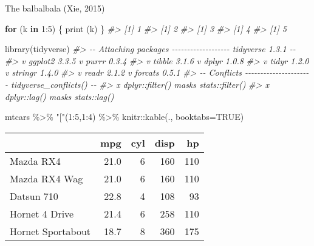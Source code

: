 \documentclass{source/tex/templates/maththesis}
\newenvironment{Shaded}{\begin{snugshade}}{\end{snugshade}}
\newcommand{\AttributeTok}[1]{\textcolor[rgb]{0.77,0.63,0.00}{#1}}
\newcommand{\CommentTok}[1]{\textcolor[rgb]{0.56,0.35,0.01}{\textit{#1}}}
\newcommand{\ConstantTok}[1]{\textcolor[rgb]{0.00,0.00,0.00}{#1}}
\newcommand{\ControlFlowTok}[1]{\textcolor[rgb]{0.13,0.29,0.53}{\textbf{#1}}}
\newcommand{\DecValTok}[1]{\textcolor[rgb]{0.00,0.00,0.81}{#1}}
\newcommand{\FunctionTok}[1]{\textcolor[rgb]{0.00,0.00,0.00}{#1}}
\newcommand{\NormalTok}[1]{#1}
\newcommand{\SpecialCharTok}[1]{\textcolor[rgb]{0.00,0.00,0.00}{#1}}
\newcommand{\StringTok}[1]{\textcolor[rgb]{0.31,0.60,0.02}{#1}}
\begin{document}
The balbalbala (Xie, 2015)

\begin{Shaded}
\begin{Highlighting}[]
\ControlFlowTok{for}\NormalTok{ (k }\ControlFlowTok{in} \DecValTok{1}\SpecialCharTok{:}\DecValTok{5}\NormalTok{) \{}
  \FunctionTok{print}\NormalTok{ (k)}
\NormalTok{\}}
\CommentTok{\#\textgreater{} [1] 1}
\CommentTok{\#\textgreater{} [1] 2}
\CommentTok{\#\textgreater{} [1] 3}
\CommentTok{\#\textgreater{} [1] 4}
\CommentTok{\#\textgreater{} [1] 5}
\end{Highlighting}
\end{Shaded}

\begin{Shaded}
\begin{Highlighting}[]
\FunctionTok{library}\NormalTok{(tidyverse)}
\CommentTok{\#\textgreater{} {-}{-} Attaching packages {-}{-}{-}{-}{-}{-}{-}{-}{-}{-}{-}{-}{-}{-}{-}{-}{-}{-}{-} tidyverse 1.3.1 {-}{-}}
\CommentTok{\#\textgreater{} v ggplot2 3.3.5     v purrr   0.3.4}
\CommentTok{\#\textgreater{} v tibble  3.1.6     v dplyr   1.0.8}
\CommentTok{\#\textgreater{} v tidyr   1.2.0     v stringr 1.4.0}
\CommentTok{\#\textgreater{} v readr   2.1.2     v forcats 0.5.1}
\CommentTok{\#\textgreater{} {-}{-} Conflicts {-}{-}{-}{-}{-}{-}{-}{-}{-}{-}{-}{-}{-}{-}{-}{-}{-}{-}{-}{-}{-}{-} tidyverse\_conflicts() {-}{-}}
\CommentTok{\#\textgreater{} x dplyr::filter() masks stats::filter()}
\CommentTok{\#\textgreater{} x dplyr::lag()    masks stats::lag()}
\end{Highlighting}
\end{Shaded}

\begin{Shaded}
\begin{Highlighting}[]
\NormalTok{mtcars }\SpecialCharTok{\%\textgreater{}\%} 
  \StringTok{"["}\NormalTok{(}\DecValTok{1}\SpecialCharTok{:}\DecValTok{5}\NormalTok{,}\DecValTok{1}\SpecialCharTok{:}\DecValTok{4}\NormalTok{) }\SpecialCharTok{\%\textgreater{}\%} 
\NormalTok{  knitr}\SpecialCharTok{::}\FunctionTok{kable}\NormalTok{(., }\AttributeTok{booktabs=}\ConstantTok{TRUE}\NormalTok{)}
\end{Highlighting}
\end{Shaded}

\begin{tabular}{lrrrr}
\toprule
  & mpg & cyl & disp & hp\\
\midrule
Mazda RX4 & 21.0 & 6 & 160 & 110\\
Mazda RX4 Wag & 21.0 & 6 & 160 & 110\\
Datsun 710 & 22.8 & 4 & 108 & 93\\
Hornet 4 Drive & 21.4 & 6 & 258 & 110\\
Hornet Sportabout & 18.7 & 8 & 360 & 175\\
\bottomrule
\end{tabular}
\end{document}
